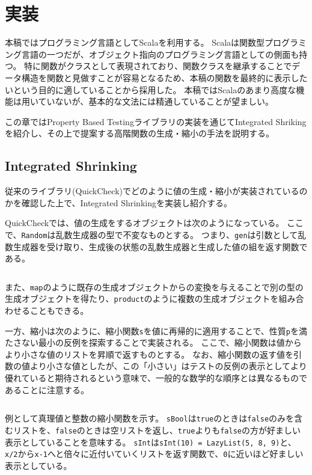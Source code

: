 \documentclass[a4paper,xelatex,ja=standard,jafont=noto]{bxjsarticle}
\theoremstyle{definition}
\begin{document}
\section{実装}

本稿ではプログラミング言語としてScala\cite{scala_online}を利用する。
Scalaは関数型プログラミング言語の一つだが、オブジェクト指向のプログラミング言語としての側面も持つ。
特に関数がクラスとして表現されており、関数クラスを継承することでデータ構造を関数と見做すことが容易となるため、本稿の関数を最終的に表示したいという目的に適していることから採用した。
本稿ではScalaのあまり高度な機能は用いていないが、基本的な文法には精通していることが望ましい。

この章ではProperty Based Testingライブラリの実装を通じてIntegrated Shrikingを紹介し、その上で提案する高階関数の生成・縮小の手法を説明する。

\subsection{Integrated Shrinking}

従来のライブラリ(QuickCheck\cite{claessen_quickcheck_2011})でどのように値の生成・縮小が実装されているのかを確認した上で、Integrated Shrinkingを実装し紹介する。

QuickCheckでは、値の生成をするオブジェクトは次のようになっている。
ここで、\texttt{Random}は乱数生成器の型で不変なものとする。
つまり、\texttt{gen}は引数として乱数生成器を受け取り、生成後の状態の乱数生成器と生成した値の組を返す関数である。

\inputminted[breaklines,firstline=31,lastline=35]{scala}{../src/main/scala/minicheck.scala}

また、\texttt{map}のように既存の生成オブジェクトからの変換を与えることで別の型の生成オブジェクトを得たり、\texttt{product}のように複数の生成オブジェクトを組み合わせることもできる。

一方、縮小は次のように、縮小関数\texttt{s}を値に再帰的に適用することで、性質\texttt{p}を満たさない最小の反例を探索することで実装される。
ここで、縮小関数は値からより小さな値のリストを昇順で返すものとする。
なお、縮小関数の返す値を引数の値より小さな値としたが、この「小さい」はテストの反例の表示としてより優れていると期待されるという意味で、一般的な数学的な順序とは異なるものであることに注意する。

\inputminted[breaklines,firstline=37,lastline=38]{scala}{../src/main/scala/minicheck.scala}

例として真理値と整数の縮小関数を示す。
\texttt{sBool}は\texttt{true}のときは\texttt{false}のみを含むリストを、\texttt{false}のときは空リストを返し、\texttt{true}よりも\texttt{false}の方が好ましい表示としていることを意味する。
\texttt{sInt}は\texttt{sInt(10) = LazyList(5, 8, 9)}と、\texttt{x/2}から\texttt{x-1}へと倍々に近付いていくリストを返す関数で、\texttt{0}に近いほど好ましい表示としている。
\end{document}
